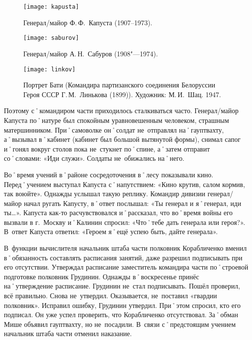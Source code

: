 \begin{figure}[h]
	\centering
	
	\begin{minipage}[h]{0.3\textwidth}			
		\texttt{[image: kapusta]}
		\caption{Генерал\-/майор Ф.\,Ф.~Капуста (1907--1973).}
		\label{fig:kapusta}		
	\end{minipage}	
	\hfill
	\begin{minipage}[h]{0.3\textwidth}			
		\texttt{[image: saburov]}
		\caption{Генерал\-/майор А.\,Н.~Сабуров (1908"---1974).}
		\label{fig:saburov}
	\end{minipage}
	\hfill
	\begin{minipage}[h]{0.3\textwidth}		
		\texttt{[image: linkov]}
		\caption{Портрет Бати (Командира партизанского соединения Белоруссии Героя СССР Г.\,М.~Линькова (1899)). Художник: М.\,И.~Шац. 1947.}
		\label{fig:linkov}
	\end{minipage}
\end{figure}

Поэтому с˚командиром части приходилось сталкиваться часто. Генерал\-/майор Капуста по˚натуре был спокойным уравновешенным человеком, страшным матершинником. При˚самоволке он˚солдат не~отправлял на˚гауптвахту, а˚вызывал в˚кабинет (кабинет был большой вытянутой формы), снимал сапог и˚гонял вокруг столов пока не~стукнет по˚спине, а˚затем отправит со˚словами: «Иди служи». Солдаты не~обижались на˚него.

Во˚время учений в˚районе сосредоточения в˚лесу показывали кино. Перед˚учением выступал Капуста с˚напутствием: «Кино крутив, салом кормив, так воюйте». Однажды услышал такую реплику. Командир дивизии генерал\-/майор начал ругать Капусту, в˚ответ послышал: «Ты генерал и я˚генерал, иди ты…». Капуста как-то расчувствовался и˚рассказал, что во˚время войны его вызвали в г.~Москву и˚Калинин спросил: «Что˚тебе дать генерала или героя?». В~ответ Капуста ответил: «Героем я˚ещё успею быть, дайте генерала». 

В~функции вычислителя начальник штаба части полковник Корабличенко вменил в˚обязанность составлять расписания занятий, даже разрешил подписывать при его отсутствии. Утверждал расписание заместитель командира части по˚строевой подготовке полковник Грудинин. Однажды в˚воскресенье принёс на˚утверждение расписание. Грудинин не~стал подписывать. Пошёл проверил, всё правильно. Снова не~утвердил. Оказывается, не~поставил «гвардии полковник». Исправил ошибку, Грудинин утвердил. При˚этом спросил, кто его подписал. Он уже успел проверить, что Корабличенко отсутствовал. За˚обман Мише объявил гауптвахту, но не~посадили. В~связи с˚предстоящим учением начальник штаба части отменил наказание.

